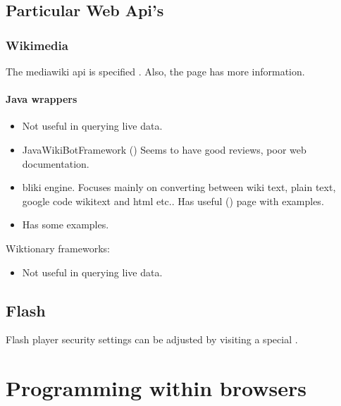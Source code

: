 \chapter{Particular Web Api's}
\section{Wikimedia}
The mediawiki api is specified . Also, the  page has more information.

\subsection{Java wrappers}
\begin{itemize}
\item {}
  \subitem Not useful in querying live data.
\item JavaWikiBotFramework ()
  \subitem Seems to have good reviews, poor web documentation.
\item {} bliki engine.
  \subitem Focuses mainly on converting between wiki text, plain text, google code wikitext and html etc..
  \subitem Has useful  () page with examples.
\item {}
  \subitem Has some examples.
\end{itemize}

Wiktionary frameworks:
\begin{itemize}
\item {}
  \subitem Not useful in querying live data.
\end{itemize}


\chapter{Flash}
Flash player security settings can be adjusted by visiting a special .



\part{Programming within browsers}
